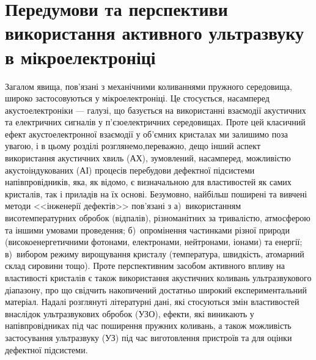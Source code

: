 \chapter{Передумови та перспективи використання активного ультразвуку в мікроелектроніці\label{Oglyad}}


Загалом явища, пов'язані з механічними коливаннями пружного середовища, широко застосовуються у мікроелектроніці.
Це стосується, насамперед акустоелектроніки --- галузі, що базується на використанні взаємодії акустичних та електричних сигналів у п'єзоелектричних середовищах.
Проте цей класичний ефект акустоелектронної взаємодії у об'ємних кристалах ми залишимо поза увагою, і в цьому розділі
розглянемо,переважно, дещо інший аспект використання акустичних хвиль (АХ),
зумовлений, насамперед, можливістю акустоіндукованих (АІ) процесів перебудови дефектної підсистеми напівпровідників, яка, як відомо, є визначальною для властивостей як самих кристалів, так і приладів на їх основі.
Безумовно, найбільш поширені та вивчені методи <<інженерії дефектів>> пов'язані з
а)~використанням висотемпературних обробок (відпалів), різноманітних за тривалістю, атмосферою та іншими умовами проведення;
б)~опромінення частинками різної природи (високоенергетичними фотонами, електронами, нейтронами, іонами) та енергії;
в)~вибором режиму вирощування кристалу (температура, швидкість, атомарний склад сировини тощо).
Проте перспективним засобом активного впливу на властивості кристалів є також використання акустичних коливань ультразвукового діапазону, про що свідчить накопичений достатньо широкий експериментальний матеріал.
Надалі розглянуті літературні дані, які стосуються змін властивостей внаслідок ультразвукових обробок (УЗО), ефекти, які виникають у напівпровідниках під час поширення пружних коливань,
а також можливість застосування ультразвуку (УЗ) під час виготовлення пристроїв та для оцінки дефектної підсистеми.

